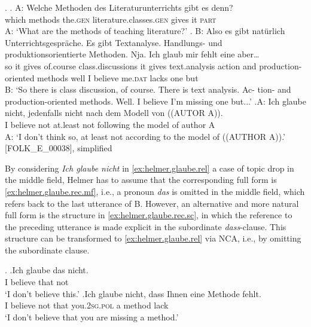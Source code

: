 \ex.\label{ex:helmer.glaube}
\ag. A: Welche Methoden des Literaturunterrichts gibt es denn?\\
{} which methods the.\textsc{gen} literature.classes.\textsc{gen} gives it \textsc{part}\\
A: `What are the methods of teaching literature?'
\bg. B: Also es gibt natürlich Unterrichtsgespräche. 
		Es gibt Textanalyse. 			
		Handlungs- und produktionsorientierte Methoden. 
		Nja. Ich glaub mir fehlt eine aber… \\
{} so it gives of.course class.discussions it gives text.analysis action and production-oriented methods well I believe me.\textsc{dat} lacks one but\\
B: `So there is class discussion, of course. There is text analysis. Ac- tion- and production-oriented methods. Well. I believe I'm missing one but...'
\cg.\label{ex:helmer.glaube.rel}A: Ich glaube nicht, jedenfalls nicht nach dem Modell von ((AUTOR A)).\\
{} I believe not at.least not following the model of author A\\
A: `I don't think so, at least not according to the model of ((AUTHOR A)).' [FOLK\_E\_00038], simplified

By considering \textit{Ich glaube nicht} in \ref{ex:helmer.glaube.rel} a case of topic drop in the middle field, Helmer has to assume that the corresponding full form is \ref{ex:helmer.glaube.rec.mf}, i.e., a pronoun \textit{das} is omitted in the middle field, which refers back to the last utterance of B.
However, an alternative and more natural full form is the structure in \ref{ex:helmer.glaube.rec.sc}, in which the reference to the preceding utterance is made explicit in the subordinate \textit{dass}-clause.
This structure can be transformed to \ref{ex:helmer.glaube.rel} via NCA, i.e., by omitting the subordinate clause.

\ex.
\ag.\label{ex:helmer.glaube.rec.mf}Ich glaube das nicht.\\
I believe that not\\
`I don't believe this.'
\bg.\label{ex:helmer.glaube.rec.sc}Ich glaube nicht, dass Ihnen eine Methode fehlt.\\
I believe not that you.\textsc{2sg.pol} a method lack\\
`I don't believe that you are missing a method.'


